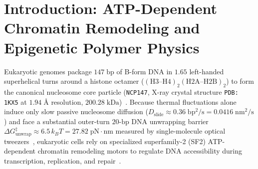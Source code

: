 \documentclass[11pt,a4paper]{article}
\theoremstyle{definition}
\begin{document}
\begin{abstract}
Barato--Seifert--Gingrich Thermodynamic Uncertainty Relation (TUR) $2 J_d(f)^2 \le \mathcal{A}_{\mathrm{tot}}(f)\dot{\Sigma}(f)$ (Theorem~2.4, \texttt{ST\_T4}). Fifth, we formally verify the Crooks Fluctuation Theorem $\ln(P_F(\gamma)/P_R(\gamma)) = \beta(W(\gamma) - \Delta F)$, the Jarzynski Equality $\langle e^{-\beta W}\rangle = e^{-\beta\Delta F}$, the Second-Law dissipated-work inequality $\Delta F \le \langle W\rangle$, and Schnakenberg's macroscopic cycle entropy production rate $\dot{\Sigma}_{\mathrm{cycle}} = J_{\mathrm{cyc}}\Delta\mu_{\mathrm{ATP}}/(k_B T) \ge 0$ (Theorem~2.5, \texttt{ST\_T5}). Sixth, we scale to multi-nucleosome chromatin state spaces by formalizing the 1D McGhee--von Hippel steric exclusion factor $g_{\mathrm{MvH}}(\ell_{\mathrm{nuc}}, \rho) = \frac{1 - \ell_{\mathrm{nuc}}\rho}{1 - (\ell_{\mathrm{nuc}}-1)\rho} \in (0,1)$ for $\ell_{\mathrm{nuc}} = 147\;\mathrm{bp}$, its crowding derivative $\partial_\rho g_{\mathrm{MvH}} = -1/(1-(\ell_{\mathrm{nuc}}-1)\rho)^2 < 0$, the 1D Tonks--Girardeau hard-rod osmotic pressure $\Pi_{\mathrm{TG}}/(k_B T) = \rho/(1-\ell_{\mathrm{nuc}}\rho)$ ($53/18 \approx 2.94\times$ pressure surge from $200\;\mathrm{bp}$ euchromatin to $165\;\mathrm{bp}$ heterochromatin), continuous 3D Rouse bead-spring chromatin polymer Langevin dissipation $\frac{d}{dt}U_{\mathrm{Rouse}} = -\zeta_{\mathrm{nuc}}^{-1}\sum_i G_i^2 \le 0$, and empirical single-molecule FRET (smFRET) and optical-tweezers unwrapping observables ($\Delta G_{\mathrm{unwrap}}^{\ddagger} = 6.5\,k_B T = 27.82\;\mathrm{pN\cdot nm}$, $D_{\mathrm{slide}} = 0.36\;\mathrm{bp^2/s}$, $k_{\mathrm{cat}} = 2.4\;\mathrm{bp/s}$, Theorem~2.6, \texttt{ST\_T6}). All six theorems compile in Lean~4 with zero \texttt{sorryAx} and zero custom axioms.
\end{abstract}

\section{Introduction: ATP-Dependent Chromatin Remodeling and Epigenetic Polymer Physics}

Eukaryotic genomes package $147\;\mathrm{bp}$ of B-form DNA in $1.65$ left-handed superhelical turns around a histone octamer ($\mathrm{(H3\text{--}H4)_2(H2A\text{--}H2B)_2}$) to form the canonical nucleosome core particle (\texttt{NCP147}, X-ray crystal structure \texttt{PDB: 1KX5} at $1.94\;\text{\AA}$ resolution, $200.28\;\mathrm{kDa}$)~\cite{Luger1997,Davey2002}. Because thermal fluctuations alone induce only slow passive nucleosome diffusion ($D_{\mathrm{slide}} \approx 0.36\;\mathrm{bp^2/s} = 0.0416\;\mathrm{nm^2/s}$) and face a substantial outer-turn $20\text{-bp}$ DNA unwrapping barrier $\Delta G_{\mathrm{unwrap}}^{\ddagger} \approx 6.5\,k_B T = 27.82\;\mathrm{pN\cdot nm}$ measured by single-molecule optical tweezers~\cite{Hall2009}, eukaryotic cells rely on specialized superfamily-2 (SF2) ATP-dependent chromatin remodeling motors to regulate DNA accessibility during transcription, replication, and repair~\cite{Clapier2017}.
\end{document}
